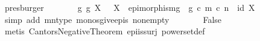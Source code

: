 \begin{isabellebody}
\ presburger\isanewline
\ \ \ \ \isamarkupfalse%
\ \isamarkupfalse%
\ {\isachardoublequoteopen}{\isasymexists}g{\isachardot}{\kern0pt}\ g{\isacharcolon}{\kern0pt}\ X\ \ {\isasymrightarrow}\ {\isasymOmega}\isactrlbsup X\isactrlesup \ {\isasymand}\ epimorphism{\isacharparenleft}{\kern0pt}g{\isacharparenright}{\kern0pt}\ {\isasymand}\ g\ {\isasymcirc}\isactrlsub c\ {\isacharparenleft}{\kern0pt}m\ {\isasymcirc}\isactrlsub c\ n{\isacharparenright}{\kern0pt}\ {\isacharequal}{\kern0pt}\ id\ {\isacharparenleft}{\kern0pt}{\isasymOmega}\isactrlbsup X\isactrlesup {\isacharparenright}{\kern0pt}{\isachardoublequoteclose}\isanewline
\ \ \ \ \ \ \isamarkupfalse%
\ {\isacharparenleft}{\kern0pt}simp\ add{\isacharcolon}{\kern0pt}\ mn{\isacharunderscore}{\kern0pt}type\ monos{\isacharunderscore}{\kern0pt}give{\isacharunderscore}{\kern0pt}epis\ nonempty{\isacharparenright}{\kern0pt}\isanewline
\ \ \ \ \isamarkupfalse%
\ \isamarkupfalse%
\ False\isanewline
\ \ \ \ \ \ \isamarkupfalse%
\ {\isacharparenleft}{\kern0pt}metis\ Cantors{\isacharunderscore}{\kern0pt}Negative{\isacharunderscore}{\kern0pt}Theorem\ epi{\isacharunderscore}{\kern0pt}is{\isacharunderscore}{\kern0pt}surj\ powerset{\isacharunderscore}{\kern0pt}def{\isacharparenright}{\kern0pt}\isanewline
\ \ \isamarkupfalse%
\isanewline
{}\isamarkupfalse%
%
\endisatagproof
{\isafoldproof}%
%
\isadelimproof
\isanewline
%
\endisadelimproof
%
\isadelimtheory
\isanewline
%
\endisadelimtheory
%
\isatagtheory
{}\isamarkupfalse%
%
\endisatagtheory
{\isafoldtheory}%
%
\isadelimtheory
%
\endisadelimtheory
%
\end{isabellebody}%
\endinput
